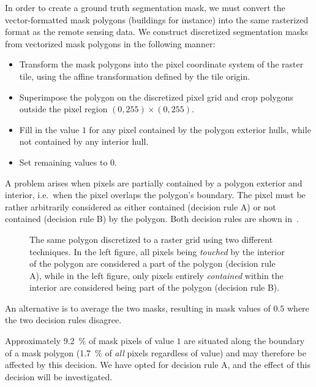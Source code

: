 In order to create a ground truth segmentation mask, we must convert the vector-formatted mask polygons (buildings for instance) into the same rasterized format as the remote sensing data.
We construct discretized segmentation masks from vectorized mask polygons in the following manner:

\begin{itemize}
  \item Transform the mask polygons into the pixel coordinate system of the raster tile, using the affine transformation defined by the tile origin.
  \item Superimpose the polygon on the discretized pixel grid and crop polygons outside the pixel region $(0, 255) \times (0, 255)$.
  \item Fill in the value $1$ for any pixel contained by the polygon exterior hulls, while not contained by any interior hull.
  \item Set remaining values to $0$.
\end{itemize}

A problem arises when pixels are partially contained by a polygon exterior and interior, i.e.\ when the pixel overlaps the polygon's boundary.
The pixel must be rather arbitrarily considered as either contained (decision rule A) or not contained (decision rule B) by the polygon.
Both decision rules are shown in~.

\begin{figure}[H]
  \centering
  
  \hspace{2em}
  
  \caption{
    The same polygon discretized to a raster grid using two different techniques.
    In the left figure, all pixels being \textit{touched} by the interior of the polygon
    are considered a part of the polygon (decision rule A), while in the left figure, only pixels
    entirely \textit{contained} within the interior are considered being part
    of the polygon (decision rule B).
  }%
  \label{fig:pixel-containment}
\end{figure}

An alternative is to average the two masks, resulting in mask values of $0.5$ where the two decision rules disagree.

Approximately \SI{9.2}{\percent} of mask pixels of value $1$ are situated along the boundary of a mask polygon (\SI{1.7}{\percent} of \textit{all} pixels regardless of value) and may therefore be affected by this decision.
We have opted for decision rule A, and the effect of this decision will be investigated.

